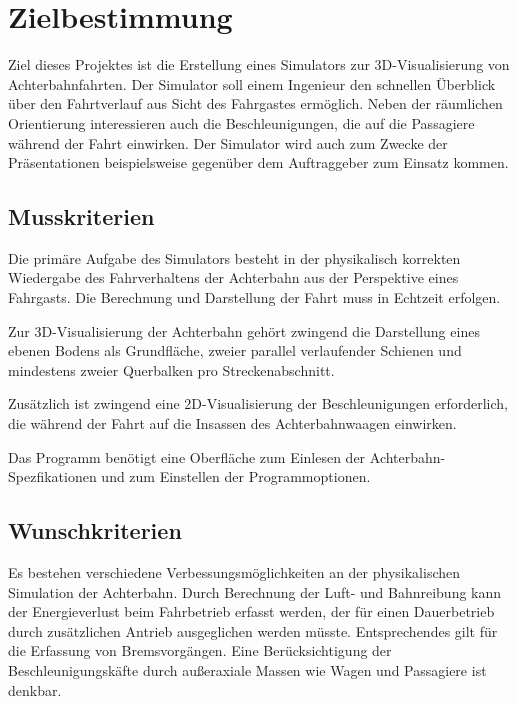 
\chapter{Zielbestimmung}
Ziel dieses Projektes ist die Erstellung eines Simulators zur 3D-Visualisierung von Achterbahnfahrten. Der Simulator soll einem Ingenieur den schnellen Überblick über den Fahrtverlauf aus Sicht des Fahrgastes ermöglich. Neben der räumlichen Orientierung interessieren auch die Beschleunigungen, die auf die Passagiere während der Fahrt einwirken. Der Simulator wird auch zum Zwecke der Präsentationen beispielsweise gegenüber dem Auftraggeber zum Einsatz kommen.

\section{Musskriterien}
Die primäre Aufgabe des Simulators besteht in der physikalisch korrekten Wiedergabe des Fahrverhaltens der Achterbahn aus der Perspektive eines Fahrgasts. Die Berechnung und Darstellung der Fahrt muss in Echtzeit erfolgen.

Zur 3D-Visualisierung der Achterbahn gehört zwingend die Darstellung eines ebenen Bodens als Grundfläche, zweier parallel verlaufender Schienen und mindestens zweier Querbalken pro Streckenabschnitt.

Zusätzlich ist zwingend eine 2D-Visualisierung der Beschleunigungen erforderlich, die während der Fahrt auf die Insassen des Achterbahnwaagen einwirken.

Das Programm benötigt eine Oberfläche zum Einlesen der Achterbahn-Spezfikationen und zum Einstellen der Programmoptionen.

\section{Wunschkriterien}

Es bestehen verschiedene Verbessungsmöglichkeiten an der physikalischen Simulation der Achterbahn. Durch Berechnung der Luft- und Bahnreibung kann der Energieverlust beim Fahrbetrieb erfasst werden, der für einen Dauerbetrieb durch zusätzlichen Antrieb ausgeglichen werden müsste. Entsprechendes gilt für die Erfassung von Bremsvorgängen. Eine Berücksichtigung der Beschleunigungskäfte durch außeraxiale Massen wie Wagen und Passagiere ist denkbar.

